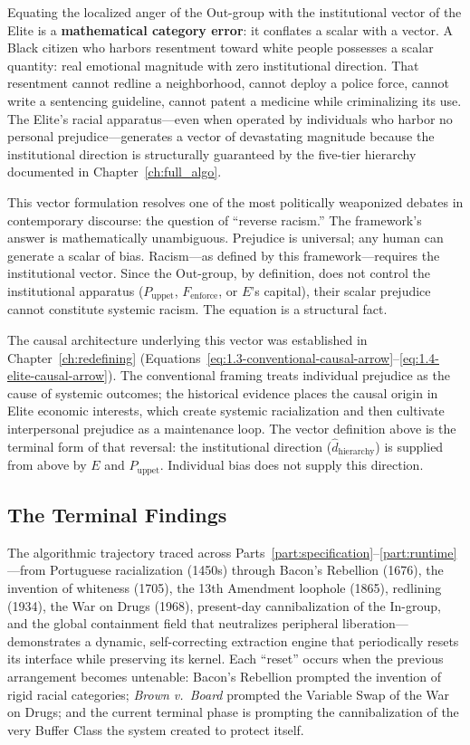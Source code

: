 Equating the localized anger of the Out-group with the institutional vector of the Elite is a \textbf{mathematical category error}: it conflates a scalar with a vector. A Black citizen who harbors resentment toward white people possesses a scalar quantity: real emotional magnitude with zero institutional direction. That resentment cannot redline a neighborhood, cannot deploy a police force, cannot write a sentencing guideline, cannot patent a medicine while criminalizing its use. The Elite's racial apparatus---even when operated by individuals who harbor no personal prejudice---generates a vector of devastating magnitude because the institutional direction is structurally guaranteed by the five-tier hierarchy documented in Chapter~\ref{ch:full_algo}.

This vector formulation resolves one of the most politically weaponized debates in contemporary discourse: the question of ``reverse racism.'' The framework's answer is mathematically unambiguous. Prejudice is universal; any human can generate a scalar of bias. Racism---as defined by this framework---requires the institutional vector. Since the Out-group, by definition, does not control the institutional apparatus ($P_{\text{uppet}}$, $F_{\text{enforce}}$, or $E$'s capital), their scalar prejudice cannot constitute systemic racism. The equation is a structural fact.

The causal architecture underlying this vector was established in Chapter~\ref{ch:redefining} (Equations~\ref{eq:1.3-conventional-causal-arrow}--\ref{eq:1.4-elite-causal-arrow}). The conventional framing treats individual prejudice as the cause of systemic outcomes; the historical evidence places the causal origin in Elite economic interests, which create systemic racialization and then cultivate interpersonal prejudice as a maintenance loop. The vector definition above is the terminal form of that reversal: the institutional direction ($\hat{d}_{\text{hierarchy}}$) is supplied from above by $E$ and $P_{\text{uppet}}$. Individual bias does not supply this direction.

\subsection*{The Terminal Findings}

The algorithmic trajectory traced across Parts~\ref{part:specification}--\ref{part:runtime}---from Portuguese racialization (1450s) through Bacon's Rebellion (1676), the invention of whiteness (1705), the 13th Amendment loophole (1865), redlining (1934), the War on Drugs (1968), present-day cannibalization of the In-group, and the global containment field that neutralizes peripheral liberation---demonstrates a dynamic, self-correcting extraction engine that periodically resets its interface while preserving its kernel. Each ``reset'' occurs when the previous arrangement becomes untenable: Bacon's Rebellion prompted the invention of rigid racial categories; \textit{Brown v.\ Board} prompted the Variable Swap of the War on Drugs; and the current terminal phase is prompting the cannibalization of the very Buffer Class the system created to protect itself.

